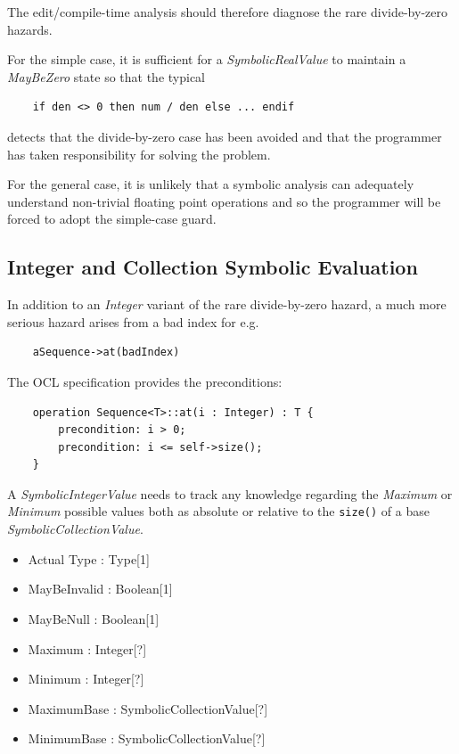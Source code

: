 \documentclass[
]{ceurart}
\begin{document}
The edit/compile-time analysis should therefore diagnose the rare divide-by-zero hazards.

For the simple case, it is sufficient for a \emph{SymbolicRealValue} to maintain a \emph{MayBeZero} state so that the typical

\begin{verbatim}
    if den <> 0 then num / den else ... endif
\end{verbatim}

detects that the divide-by-zero case has been avoided and that the programmer has taken responsibility for solving the problem.

For the general case, it is unlikely that a symbolic analysis can adequately understand non-trivial floating point operations and so the programmer will be forced to adopt the simple-case guard.

\subsection{Integer and Collection Symbolic Evaluation}

In addition to an \emph{Integer} variant of the rare divide-by-zero hazard, a much more serious hazard arises from a bad index for e.g.

\begin{verbatim}
    aSequence->at(badIndex)
\end{verbatim}

The OCL specification provides the preconditions:

\begin{verbatim}
    operation Sequence<T>::at(i : Integer) : T {
        precondition: i > 0;
        precondition: i <= self->size();
    }
\end{verbatim}

A \emph{SymbolicIntegerValue} needs to track any knowledge regarding the \emph{Maximum} or \emph{Minimum} possible values both as absolute or relative to the \verb|size()| of a base \emph{SymbolicCollectionValue}. 

\begin{itemize}
	\item Actual Type : Type[1]
	\item MayBeInvalid : Boolean[1]
	\item MayBeNull : Boolean[1]
    \item Maximum : Integer[?]
	\item Minimum : Integer[?]
    \item MaximumBase : SymbolicCollectionValue[?]
    \item MinimumBase : SymbolicCollectionValue[?]
\end{itemize}  
\end{document}
